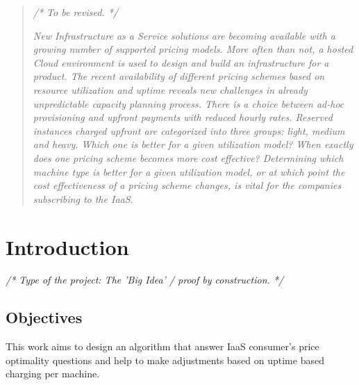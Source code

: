 \documentclass[]{final_report}
\begin{document}
\maketitle
\tableofcontents{}\newpage


\begin{abstract}

\emph{ /* To be revised. */} \par
\textsl{New Infrastructure as a Service solutions are becoming available with a growing number of supported pricing models. More often than not, a hosted Cloud environment is used to design and build an infrastructure for a product. The recent availability of different pricing schemes based on resource utilization and uptime reveals new challenges in already unpredictable capacity planning process. There is a choice between ad-hoc provisioning and upfront payments with reduced hourly rates. Reserved instances charged upfront are categorized into three groups: light, medium and heavy. Which one is better for a given utilization model? When exactly does one pricing scheme becomes more cost effective? Determining which machine type is better for a given utilization model, or at which point the cost effectiveness of a pricing scheme changes, is vital for the companies subscribing to the IaaS. }

\end{abstract}
\newpage


\chapter{Introduction}

\emph{ /* Type of the project: The 'Big Idea' / proof by construction. */}

\section{Objectives}
This work aims to design an algorithm that answer IaaS consumer's price optimality questions and help to make adjustments based on uptime based charging per machine. 

\end{document}
